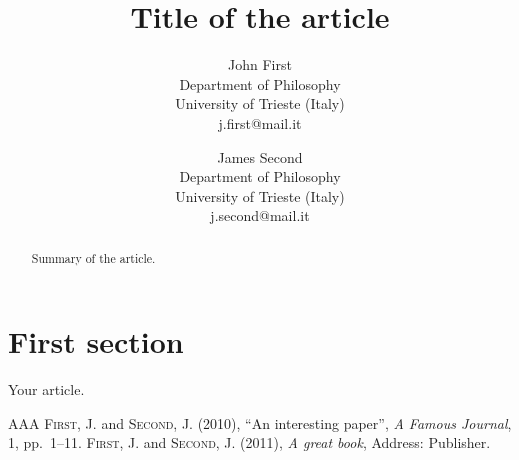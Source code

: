 \documentclass{lps}
\begin{document}
\title{Title of the article}
\author{John First\\Department of Philosophy\\University of Trieste (Italy)\\j.first@mail.it \and%
            James Second\\Department of Philosophy\\University of Trieste (Italy)\\j.second@mail.it}

\maketitle
\tableofcontents


\begin{abstract}
Summary of the article.
\end{abstract}

\section{First section}
Your article.\par
\lipsum[1-10]
\begin{thebibliography}{AAA}
 \textsc{First, J.} and \textsc{Second, J.} (2010), ``An interesting paper'', \emph{A Famous Journal}, 1, pp.~1--11.
 \textsc{First, J.} and \textsc{Second, J.} (2011), \emph{A great book}, Address: Publisher.
\end{thebibliography}
\end{document}

